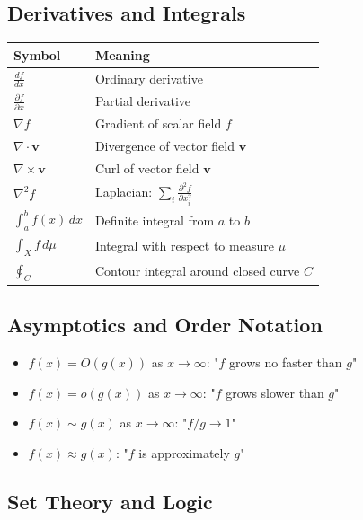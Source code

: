 \subsection*{Derivatives and Integrals}

\begin{center}
\begin{tabular}{ll}
\toprule
\textbf{Symbol} & \textbf{Meaning} \\
\midrule
$\frac{df}{dx}$ & Ordinary derivative \\
$\frac{\partial f}{\partial x}$ & Partial derivative \\
$\nabla f$ & Gradient of scalar field $f$ \\
$\nabla \cdot \mathbf{v}$ & Divergence of vector field $\mathbf{v}$ \\
$\nabla \times \mathbf{v}$ & Curl of vector field $\mathbf{v}$ \\
$\nabla^2 f$ & Laplacian: $\sum_i \frac{\partial^2 f}{\partial x_i^2}$ \\
$\int_a^b f(x)\,dx$ & Definite integral from $a$ to $b$ \\
$\int_X f\,d\mu$ & Integral with respect to measure $\mu$ \\
$\oint_C$ & Contour integral around closed curve $C$ \\
\bottomrule
\end{tabular}
\end{center}

\subsection*{Asymptotics and Order Notation}

\begin{itemize}
\item $f(x) = O(g(x))$ as $x \to \infty$: "$f$ grows no faster than $g$"
\item $f(x) = o(g(x))$ as $x \to \infty$: "$f$ grows slower than $g$"
\item $f(x) \sim g(x)$ as $x \to \infty$: "$f/g \to 1$"
\item $f(x) \approx g(x)$: "$f$ is approximately $g$"
\end{itemize}

\subsection*{Set Theory and Logic}

